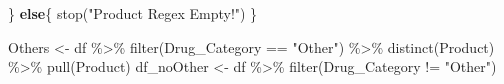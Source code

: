 \documentclass[
  letterpaper,
  DIV=11,
  numbers=noendperiod]{scrartcl}
\newenvironment{Shaded}{\begin{snugshade}}{\end{snugshade}}
\newcommand{\ControlFlowTok}[1]{\textcolor[rgb]{0.00,0.23,0.31}{\textbf{#1}}}
\newcommand{\FunctionTok}[1]{\textcolor[rgb]{0.28,0.35,0.67}{#1}}
\newcommand{\NormalTok}[1]{\textcolor[rgb]{0.00,0.23,0.31}{#1}}
\newcommand{\OtherTok}[1]{\textcolor[rgb]{0.00,0.23,0.31}{#1}}
\newcommand{\SpecialCharTok}[1]{\textcolor[rgb]{0.37,0.37,0.37}{#1}}
\newcommand{\StringTok}[1]{\textcolor[rgb]{0.13,0.47,0.30}{#1}}
\begin{document}
\begin{Shaded}
\begin{Highlighting}[]
\NormalTok{\} }\ControlFlowTok{else}\NormalTok{\{ }\FunctionTok{stop}\NormalTok{(}\StringTok{"Product Regex Empty!"}\NormalTok{) \}}

\NormalTok{Others }\OtherTok{\textless{}{-}}\NormalTok{ df }\SpecialCharTok{\%\textgreater{}\%} \FunctionTok{filter}\NormalTok{(Drug\_Category }\SpecialCharTok{==} \StringTok{"Other"}\NormalTok{) }\SpecialCharTok{\%\textgreater{}\%} \FunctionTok{distinct}\NormalTok{(Product) }\SpecialCharTok{\%\textgreater{}\%} \FunctionTok{pull}\NormalTok{(Product)}
\NormalTok{df\_noOther }\OtherTok{\textless{}{-}}\NormalTok{ df }\SpecialCharTok{\%\textgreater{}\%} \FunctionTok{filter}\NormalTok{(Drug\_Category }\SpecialCharTok{!=} \StringTok{"Other"}\NormalTok{)}
\end{Highlighting}
\end{Shaded}
\end{document}
